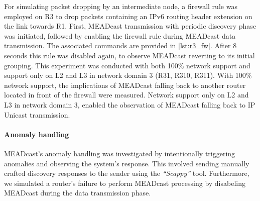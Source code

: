 For simulating packet dropping by an intermediate node, a firewall rule was
    employed on R3 to drop packets containing an IPv6 routing header extension
    on the link towards R1.
First, MEADcast transmission with periodic discovery phase was initiated,
    followed by enabling the firewall rule during MEADcast data transmission.
The associated commands are provided in \autoref{lst:r3_fw}.
After 8 seconds this rule was disabled again, to observe MEADcast reverting to
    its initial grouping.
This experiment was conducted with both 100\% network support and support only
    on L2 and L3 in network domain 3 (R31, R310, R311).
With 100\% network support, the implications of MEADcast falling back to
    another router located in front of the firewall were measured.
Network support only on L2 and L3 in network domain 3, enabled the
    observation of MEADcast falling back to IP Unicast transmission.

\paragraph{Anomaly handling} %
\label{par:Anomaly handling}
MEADcast's anomaly handling was investigated by intentionally triggering
    anomalies and observing the system's response.
This involved sending manually crafted discovery responses to the sender using
    the \textit{``Scappy''} tool.
Furthermore, we simulated a router's failure to perform MEADcast processing by
    disabeling MEADcast during the data transmission phase.
